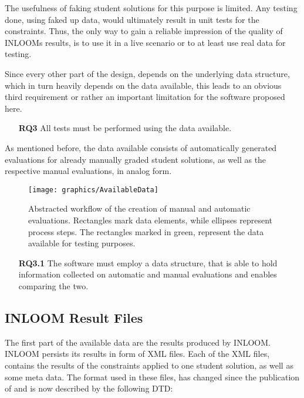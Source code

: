 The usefulness of faking student solutions for this purpose is limited. Any testing done,
using faked up data, would ultimately result in unit tests for the constraints. Thus, the 
only way to gain a reliable impression of the quality of INLOOMs results, is to use it
in a live scenario or to at least use real data for testing.

Since every other part of the design, depends on the underlying data structure, which in turn 
heavily depends on the data available, this leads to an obvious third requirement or rather an
important limitation for the software proposed here.

\begin{itemize}
    \item[\textbf{RQ3}] All tests must be performed using the data available.
\end{itemize}

As mentioned before, the data available consists of automatically generated evaluations
for already manually graded student solutions, as well as the respective manual evaluations,
in analog form. 

\begin{figure}[h]
    \caption{Abstracted workflow of the creation of manual and automatic evaluations. Rectangles
    mark data elements, while ellipses represent process steps. The rectangles marked in green, 
    represent the data available for testing purposes.}
    \centering
    \texttt{[image: graphics/AvailableData]}
\end{figure}

\begin{itemize}
    \item[\textbf{RQ3.1}] The software must employ a data structure, that is able to hold
    information collected on automatic and manual evaluations and enables comparing the two.
\end{itemize}


\subsection{INLOOM Result Files}

The first part of the available data are the results produced by INLOOM. INLOOM persists its 
results in form of XML files. Each of the XML files, contains the results of the constraints 
applied to one student solution, as well as some meta data. The format used in these files,
has changed since the publication of \cite{1} and is now described by the following DTD:

